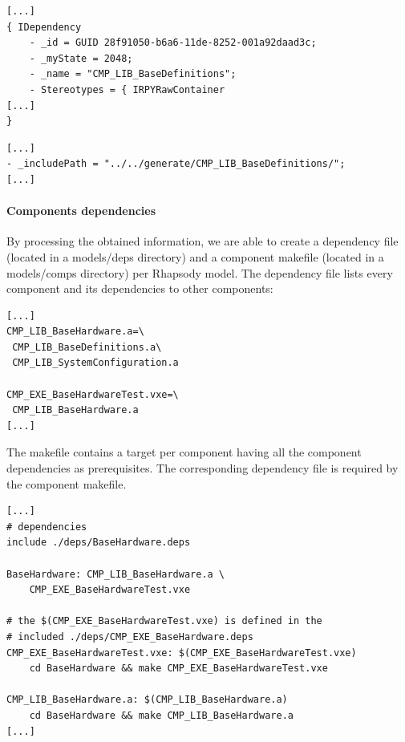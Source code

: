 \documentclass[dvips]{imsart}
\begin{document}
\lstset{frame=shadowbox, numbers=left, breaklines=true,
caption=snippet of CMP\_LIB\_HardwareDefinitions.cmp dependencies from component
diagram}
\begin{lstlisting}
[...]
{ IDependency
    - _id = GUID 28f91050-b6a6-11de-8252-001a92daad3c;
    - _myState = 2048;
    - _name = "CMP_LIB_BaseDefinitions";
    - Stereotypes = { IRPYRawContainer
[...]
}
\end{lstlisting}
\lstset{frame=shadowbox, numbers=left, breaklines=true,
caption=snippet of CMP\_LIB\_HardwareDefinitions.cmp dependencies form include
paths}
\begin{lstlisting}
[...]
- _includePath = "../../generate/CMP_LIB_BaseDefinitions/";
[...]
\end{lstlisting}

\paragraph{Components dependencies}
By processing the obtained information, we are able to create a dependency
file (located in a models/deps directory) and a component makefile (located in a
models/comps directory) per Rhapsody model. The dependency file lists every
component and its dependencies to other components:

\begin{lstlisting}
[...]
CMP_LIB_BaseHardware.a=\
 CMP_LIB_BaseDefinitions.a\
 CMP_LIB_SystemConfiguration.a

CMP_EXE_BaseHardwareTest.vxe=\
 CMP_LIB_BaseHardware.a
[...]
\end{lstlisting}

The makefile contains a target per component having all the component
dependencies as prerequisites. The corresponding dependency file is required by the component makefile.
\label{compMake}
\begin{lstlisting}
[...]
# dependencies
include ./deps/BaseHardware.deps

BaseHardware: CMP_LIB_BaseHardware.a \
    CMP_EXE_BaseHardwareTest.vxe

# the $(CMP_EXE_BaseHardwareTest.vxe) is defined in the
# included ./deps/CMP_EXE_BaseHardware.deps
CMP_EXE_BaseHardwareTest.vxe: $(CMP_EXE_BaseHardwareTest.vxe)
    cd BaseHardware && make CMP_EXE_BaseHardwareTest.vxe
   
CMP_LIB_BaseHardware.a: $(CMP_LIB_BaseHardware.a)
    cd BaseHardware && make CMP_LIB_BaseHardware.a
[...]
\end{lstlisting}
\end{document}
